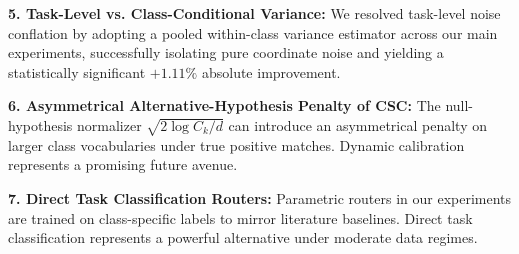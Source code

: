 \textbf{5. Task-Level vs. Class-Conditional Variance:} We resolved task-level noise conflation by adopting a pooled within-class variance estimator across our main experiments, successfully isolating pure coordinate noise and yielding a statistically significant $+1.11\%$ absolute improvement.

\textbf{6. Asymmetrical Alternative-Hypothesis Penalty of CSC:} The null-hypothesis normalizer $\sqrt{2\log C_k / d}$ can introduce an asymmetrical penalty on larger class vocabularies under true positive matches. Dynamic calibration represents a promising future avenue.

\textbf{7. Direct Task Classification Routers:} Parametric routers in our experiments are trained on class-specific labels to mirror literature baselines. Direct task classification represents a powerful alternative under moderate data regimes.
